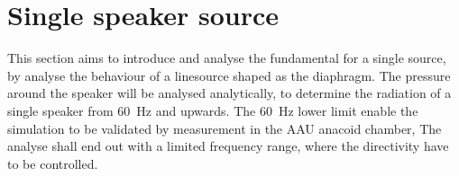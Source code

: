 \section{Single speaker source}
This section aims to introduce and analyse the fundamental for a single source, by analyse the behaviour of a linesource shaped as the diaphragm. The pressure around the speaker will be analysed analytically, to determine the radiation of a single speaker from \SI{60}{\hertz} and upwards. The \SI{60}{\hertz} lower limit enable the simulation to be validated by measurement in the AAU anacoid chamber,  The analyse shall end out with a limited frequency range, where the directivity have to be controlled.
